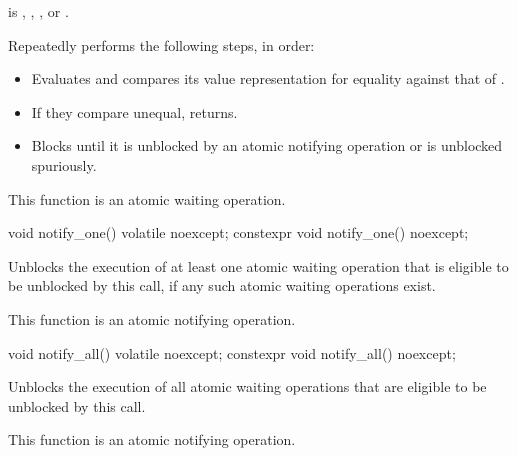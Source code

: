 \begin{itemdescr}
\pnum
\expects
{} is
,
,
, or
.

\pnum
\effects
Repeatedly performs the following steps, in order:
\begin{itemize}
\item
  Evaluates  and
  compares its value representation for equality against that of .
\item
  If they compare unequal, returns.
\item
  Blocks until it
  is unblocked by an atomic notifying operation or is unblocked spuriously.
\end{itemize}

\pnum
\remarks
This function is an atomic waiting operation.
\end{itemdescr}

%
%
%
%
\begin{itemdecl}
void notify_one() volatile noexcept;
constexpr void notify_one() noexcept;
\end{itemdecl}

\begin{itemdescr}
\pnum
\effects
Unblocks the execution of at least one atomic waiting operation
that is eligible to be unblocked by this call,
if any such atomic waiting operations exist.

\pnum
\remarks
This function is an atomic notifying operation.
\end{itemdescr}

%
%
%
%
\begin{itemdecl}
void notify_all() volatile noexcept;
constexpr void notify_all() noexcept;
\end{itemdecl}

\begin{itemdescr}
\pnum
\effects
Unblocks the execution of all atomic waiting operations
that are eligible to be unblocked by this call.

\pnum
\remarks
This function is an atomic notifying operation.
\end{itemdescr}

